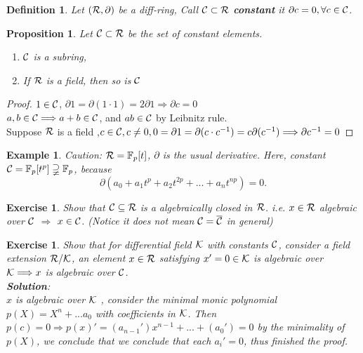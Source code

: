 \documentclass[11pt]{article}
\newtheorem{prop}[thm]{Proposition}
\newtheorem{exercise}[thm]{Exercise}
\newtheorem{dfn}[thm]{Definition}
\newtheorem{ex}[thm]{Example}
\newcommand{\pd}{\partial}
\newcommand{\bbf}{\mathbb F}
\newcommand{\calc}{{\cal C}}
\newcommand{\calk}{{\cal K}}
\newcommand{\calr}{{\cal R}}
\newcommand{\Lrta}{\Longrightarrow}
\begin{document}
\begin{dfn}
Let $(\calr, \pd)$ be a diff-ring, Call $\calc\subset\calr$ \textbf{constant} it $\pd c=0,\forall c\in \calc$.
\end{dfn}

\begin{prop}
Let $\calc\subset\calr$ be the set of constant elements.
\begin{enumerate}
\item $\calc$ is a subring,
\item If $\calr$ is a field, then so is $\calc$
\end{enumerate}
\end{prop}
\begin{proof}
$1\in\calc$, $\pd 1=\pd (1\cdot 1)=2\pd 1\Longrightarrow \pd c=0$\\
$a,b\in \calc\Longrightarrow a+b\in \calc$, and $ab\in\calc$ by Leibnitz rule.\\
Suppose $\calr$ is a field ,$c\in \calc, c\neq 0, 0=\pd 1=\pd (c\cdot c^{-1})=c\pd (c^{-1})\Longrightarrow \pd c^{-1}=0$
\end{proof}
\begin{ex}
Caution: $\calr=\bbf_p[t]$, $\pd$ is the usual derivative. Here, constant $\calc= \bbf_p[t^p]\supsetneqq \bbf_p$, because
$$
\pd(a_0+a_1 t^p+a_2 t^{2p}+...+a_n t^{np})=0.
$$
\end{ex}

\begin{exercise}
Show that $\calc \subseteq \calr$ is a algebraically closed in $\calr$. i.e. $x\in \calr$ algebraic over $\calc$ $\Longrightarrow$ $x\in \calc$. (Notice it does not mean $\calc=\overline{\calc}$ in general)
\end{exercise}

\begin{exercise}\label{exr:1.7}
Show that for differential field $\calk$ with constants $\calc$, consider a field extension $\calr/\calk$, an element $x\in \calr$ satisfying $x'=0\in \calk$  is algebraic over $\calk\Lrta x$ is algebraic over $\calc$.\\
\textbf{Solution}:\\
$x$ is algebraic over $\calk$ , consider the minimal monic polynomial $p(X)= X^n+...a_0$ with coefficients in $\calk$. Then $p(c)=0\Lrta p(x)'=(a_{n-1}')x^{n-1}+...+(a_0')=0$ by the minimality of $p(X)$, we conclude that we conclude that each $a_{i}'=0$, thus finished the proof.
\end{exercise}
\end{document}

